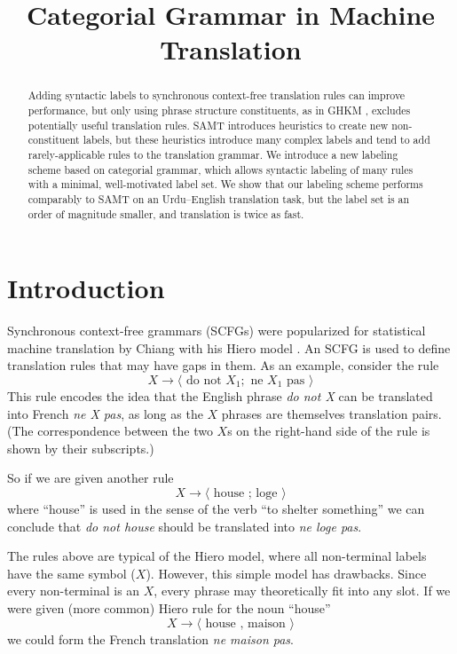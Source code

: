 \documentclass[a4paper]{article}
\author{
\anonymize{
Jonathan Weese \and Chris Callison-Burch \and Adam Lopez\\
Department of Computer Science\\
Human Language Technology Center of Excellence\\ %
Johns Hopkins University\\
Baltimore, MD 21218 USA\\
{\tt \{jonny,ccb,alopez\}@cs.jhu.edu}}
}
\title{Categorial Grammar in Machine Translation}
\begin{document}
\maketitle

\begin{abstract}
Adding syntactic labels to synchronous context-free translation rules can improve performance, but only using phrase structure constituents, as in GHKM \cite{ghkm}, excludes potentially useful translation rules. SAMT \cite{samt-wmt06} introduces heuristics to create new non-constituent labels, but these heuristics introduce many complex labels and tend to add rarely-applicable rules to the translation grammar. We introduce a new labeling scheme based on categorial grammar, which allows syntactic labeling of many rules with a minimal, well-motivated label set. We show that our labeling scheme performs comparably to SAMT on an Urdu--English translation task, but the label set is an order of magnitude smaller, and translation is twice as fast.
\end{abstract}

\section{Introduction}

Synchronous context-free grammars (SCFGs) were popularized for statistical machine translation by Chiang with his Hiero model . An SCFG is used to define translation rules that may have gaps in them.
As an example, consider the rule
\begin{equation}
X \to \langle \textrm{ do not } X_1 ; \textrm{ ne } X_1 \textrm{ pas } \rangle \label{rule:ne_pas}
\end{equation}
This rule encodes the idea that the English phrase {\em do not X} can be translated into French {\em ne X pas}, as long as the $X$ phrases are themselves translation pairs. (The correspondence between the two $X$s on the right-hand side of the rule is shown by their subscripts.)

So if we are given another rule
\begin{equation}
X \to \langle \textrm{ house ; loge } \rangle
\end{equation}
where ``house'' is used in the sense of the verb ``to shelter something'' we can conclude that {\em do not house} should be translated into {\em ne loge pas}.

The rules above are typical of the Hiero model, where all non-terminal labels have the same symbol ($X$). However, this simple model has drawbacks. Since every non-terminal is an $X$, every phrase may theoretically fit into any slot. If we were given (more common) Hiero rule for the noun ``house''
\begin{equation}
X \to \langle \textrm{ house , maison } \rangle
\end{equation}
we could form the French translation {\em ne maison pas}. 
\end{document}
